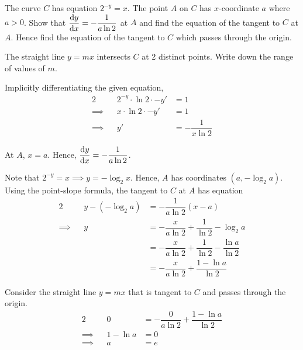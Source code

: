 \documentclass{echw}
\begin{document}

    \problem{}
        The curve $C$ has equation $2^{-y} = x$. The point $A$ on $C$ has $x$-coordinate $a$ where $a > 0$. Show that $\dfrac{\mathrm{d} y}{\mathrm{d} x} = -\dfrac1{a\ln2}$ at $A$ and find the equation of the tangent to $C$ at $A$. Hence find the equation of the tangent to $C$ which passes through the origin.
        
        The straight line $y = mx$ intersects $C$ at 2 distinct points. Write down the range of values of $m$.

    \solution
        Implicitly differentiating the given equation,
        \begin{alignat*}{2}
            &&2^{-y} \cdot \ln 2 \cdot -y' &= 1\\
            \implies&&x \cdot \ln 2 \cdot -y' &= 1\\
            \implies&&y' &= -\dfrac{1}{x \ln 2}
        \end{alignat*}

        At $A$, $x = a$. Hence, $\dfrac{\mathrm{d} y}{\mathrm{d} x} = -\dfrac{1}{a \ln 2}$.

        \medskip

        Note that $2^{-y} = x \implies y = -\log_2{x}$. Hence, $A$ has coordinates $(a, -\log_2{a})$. Using the point-slope formula, the tangent to $C$ at $A$ has equation
                \begin{alignat*}{2}
            &&y-(-\log_2{a}) &= -\dfrac1{a\ln2}(x-a)\\
            \implies&&y &= -\dfrac{x}{a\ln2} + \dfrac1{\ln2} - \log_2{a}\\
            && &= -\dfrac{x}{a\ln2} + \dfrac1{\ln2} - \dfrac{\ln a}{\ln 2}\\
            && &= -\dfrac{x}{a\ln2} + \dfrac{1 - \ln a}{\ln2}
        \end{alignat*}


        Consider the straight line $y = mx$ that is tangent to $C$ and passes through the origin.
        \begin{alignat*}{2}
            &&0 &= -\dfrac{0}{a\ln2} + \dfrac{1 - \ln a}{\ln2}\\
            \implies&&1-\ln a &= 0\\
            \implies&&a &= e
        \end{alignat*}
\end{document}
